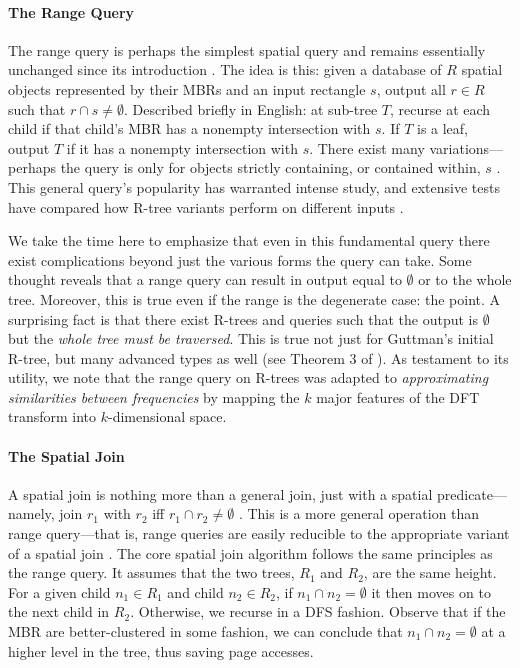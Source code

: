 \paragraph{The Range Query}
The range query is perhaps the simplest spatial query and remains essentially unchanged since its introduction \cite{guttman84}.
The idea is this: given a database of $R$ spatial objects represented by their MBRs and an input rectangle $s$, output all $r\in R$ such that $r\cap s\neq\emptyset$.
Described briefly in English: at sub-tree $T$, recurse at each child if that child's MBR has a nonempty intersection with $s$.
If $T$ is a leaf, output $T$ if it has a nonempty intersection with $s$.
There exist many variations---perhaps the query is only for objects strictly containing, or contained within, $s$ \cite{gaedegunther98}.
This general query's popularity has warranted intense study, and extensive tests have compared how R-tree variants perform on different inputs \cite{papadiassellistheodoridisegenhofer95}.

We take the time here to emphasize that even in this fundamental query there exist complications beyond just the various forms the query can take.
Some thought reveals that a range query can result in output equal to $\emptyset$ or to the whole tree.
Moreover, this is true even if the range is the degenerate case: the point.
A surprising fact is that there exist R-trees and queries such that the output is $\emptyset$ but the \emph{whole tree must be traversed}.
This is true not just for Guttman's initial R-tree, but many advanced types as well (see Theorem 3 of \cite{argeberghaverkortyi04}).
As testament to its utility, we note that the range query on R-trees was adapted to \emph{approximating similarities between frequencies} \cite{agrawalfaloutsosswami93} by mapping the $k$ major features of the DFT transform into $k$-dimensional space.

\paragraph{The Spatial Join}
A spatial join is nothing more than a general join, just with a spatial predicate---namely, join $r_1$ with $r_2$ iff $r_1\cap r_2\neq\emptyset$ \cite{brinkhoffkriegelseeger93}.
This is a more general operation than range query---that is, range queries are easily reducible to the appropriate variant of a spatial join \cite{gaedegunther98}.
The core spatial join algorithm \cite{brinkhoffkriegelseeger93} follows the same principles as the range query.
It assumes that the two trees, $R_1$ and $R_2$, are the same height.
For a given child $n_1\in R_1$ and child $n_2\in R_2$, if $n_1\cap n_2=\emptyset$ it then moves on to the next child in $R_2$.
Otherwise, we recurse in a DFS fashion.
Observe that if the MBR are better-clustered in some fashion, we can conclude that $n_1\cap n_2=\emptyset$ at a higher level in the tree, thus saving page accesses.

